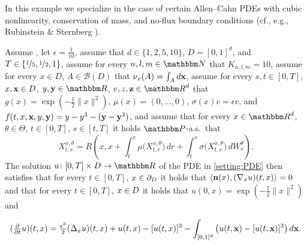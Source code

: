 \begin{example}
	\label{exampleMLP:allen_cahn}
	In this example we specialize  in the case of certain Allen--Cahn PDEs with cubic nonlinearity, conservation of mass, and no-flux boundary conditions (cf., e.g., Rubinstein \& Sternberg \cite{RUBINSTEIN1992}).
	
	Assume ,
	let 
	$\epsilon = \tfrac{1}{10}$,
	assume that
	$d\in\{1,2,5,10\}$,
	$D = [0, 1]^d$, and
	$T\in\{\nicefrac{1}{5},\nicefrac{1}{2},1\}$,
	assume for every 
	$n,l,m\in \N$ 
	that
	$K_{n,l,m} = 10$,
	assume for every
	$x \in D$,
	$A \in \mathcal{B}(D)$
	that
	$\nu_x(A) = \int_A d{\textbf x}$,
	assume for every 
	$s,t \in [0,T]$,
	$x,{\textbf x} \in D$,
	$y,{\textbf y} \in \R$,
	$v,z, {\textbf z} \in \R^d$ 
	that
	$g(x)= \exp (- \tfrac{1}{2}\|x\|^2)$,
	$\mu(x)=(0,\dots,0)$,
	$\sigma(x) v = \epsilon v$, 
	and
	$f(t,x,{\textbf x},y,{\textbf y})= y - y^3 - (\textbf{y} - {\textbf y}^3)$,
	and
	assume that for every 
	$x\in \R^{d}$, 
	$\theta \in \Theta$, 
	$t\in [0,T]$, 
	$s\in [t,T]$ 
	it holds 
	$\P$-a.s.\ that
	\begin{equation}
	X^{x,\theta}_{t,s} 
	= R\!\left(x,x + \int_{t}^{s} \mu\big(X^{x,\theta}_{t,r}\big) \, dr + \int^{s}_{t} \sigma \big(X^{x,\theta}_{t,r}\big) \, dW^{\theta}_{r} \right)\!.
	\end{equation}
	The solution $u\colon[0,T]\times \D \to \R$ of the PDE in \eqref{setting:PDE} then satisfies that for every
	$t\in [0,T]$, $x\in\partial_D$
	it holds that
	$\left<{\textbf n}(x) ,(\nabla_x u)(t,x)\right> = 0$
	and that for every
	$t\in [0,T]$, $x\in D$
	it holds that
	$u(0,x) = \exp (- \tfrac{1}{2}\|x\|^2)$ and
	
	\begin{equation}
		(\tfrac{\partial}{\partial t}u)(t,x)
		=
		\tfrac{\epsilon^2}{2} (\Delta_x u)(t,x) + u(t,x) - [u(t,x)]^3 - \int_{[0,1]^d} \left(u(t,{\textbf x}) - [u(t,{\textbf x})]^3 \right) d{\textbf x} .
		\label{eqMLP:allen_cahn}
	\end{equation}

\end{example}


